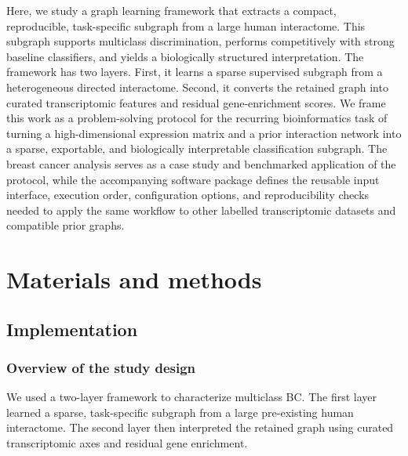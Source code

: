 \documentclass[unnumsec,webpdf,modern,large]{oup-authoring-template}
\begin{document}
Here, we study a graph learning framework that extracts a compact, reproducible, task-specific subgraph from a large human interactome. This subgraph supports multiclass discrimination, performs competitively with strong baseline classifiers, and yields a biologically structured interpretation. The framework has two layers. First, it learns a sparse supervised subgraph from a heterogeneous directed interactome. Second, it converts the retained graph into curated transcriptomic features and residual gene-enrichment scores. We frame this work as a problem-solving protocol for the recurring bioinformatics task of turning a high-dimensional expression matrix and a prior interaction network into a sparse, exportable, and biologically interpretable classification subgraph. The breast cancer analysis serves as a case study and benchmarked application of the protocol, while the accompanying software package defines the reusable input interface, execution order, configuration options, and reproducibility checks needed to apply the same workflow to other labelled transcriptomic datasets and compatible prior graphs.

\section{Materials and methods}

\subsection{Implementation}

\subsubsection{Overview of the study design}
We used a two-layer framework to characterize multiclass BC. The first layer learned a sparse, task-specific subgraph from a large pre-existing human interactome. The second layer then interpreted the retained graph using curated transcriptomic axes and residual gene enrichment.
\end{document}
